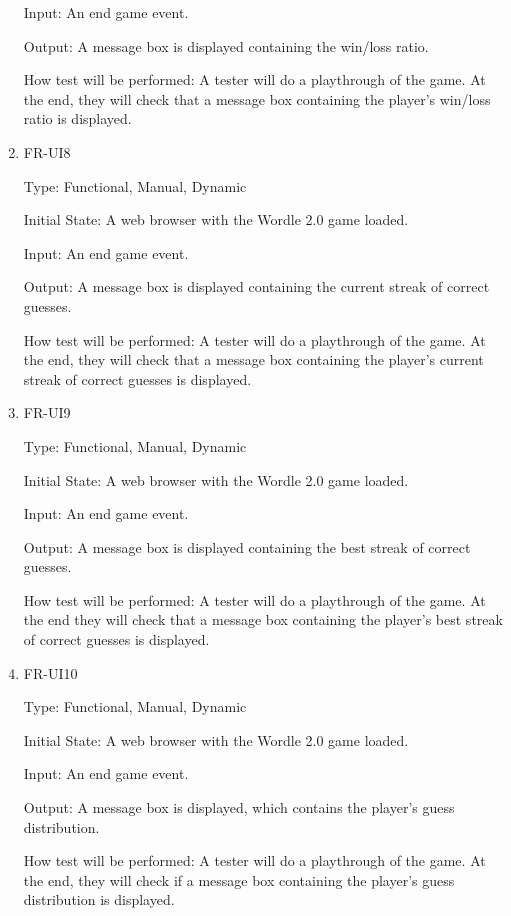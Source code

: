\documentclass[12pt, titlepage]{article}
\begin{document}
\begin{enumerate}
Input: An end game event.

Output: A message box is displayed containing the win/loss ratio.

How test will be performed: A tester will do a playthrough of the game. At the 
end, they will check that a message box containing the player's win/loss ratio 
is 
displayed.

\item{FR-UI8\\}

Type: Functional, Manual, Dynamic

Initial State: A web browser with the Wordle 2.0 game loaded.

Input: An end game event.

Output: A message box is displayed containing the current streak of correct 
guesses.

How test will be performed: A tester will do a playthrough of the game. At the 
end, they will check that a message box containing the player's current streak 
of correct guesses is displayed.

\item{FR-UI9\\}

Type: Functional, Manual, Dynamic

Initial State: A web browser with the Wordle 2.0 game loaded.

Input: An end game event.

Output: A message box is displayed containing the best streak of correct 
guesses.

How test will be performed: A tester will do a playthrough of the game. At the 
end they will check that a message box containing the player's best streak 
of correct guesses is displayed.

\item{FR-UI10\\}

Type: Functional, Manual, Dynamic

Initial State: A web browser with the Wordle 2.0 game loaded.

Input: An end game event.

Output: A message box is displayed, which contains the player's guess 
distribution.

How test will be performed: A tester will do a playthrough of the game. At the 
end, they will check if a message box containing the player's guess 
distribution is displayed.

\end{enumerate}
\end{document}
